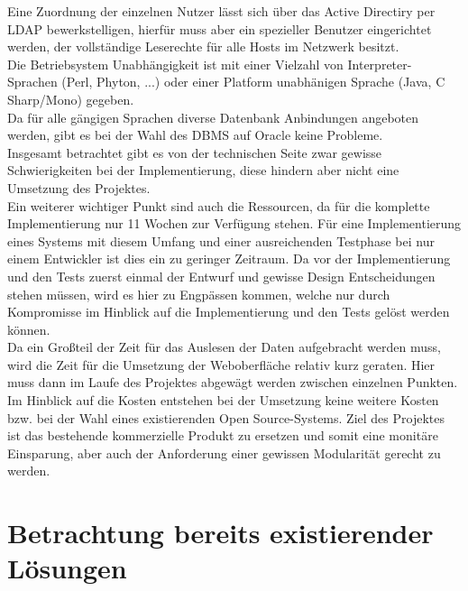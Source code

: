 Eine Zuordnung der einzelnen Nutzer lässt sich über das Active Directiry per LDAP bewerkstelligen, hierfür muss aber ein spezieller Benutzer eingerichtet werden, der vollständige Leserechte für alle Hosts im Netzwerk besitzt.\\
Die Betriebsystem Unabhängigkeit ist mit einer Vielzahl von Interpreter-Sprachen (Perl, Phyton, ...) oder einer Platform unabhänigen Sprache (Java, C Sharp/Mono) gegeben.\\
Da für alle gängigen Sprachen diverse Datenbank Anbindungen angeboten werden, gibt es bei der Wahl des DBMS auf Oracle keine Probleme.\\
Insgesamt betrachtet gibt es von der technischen Seite zwar gewisse Schwierigkeiten bei der Implementierung, diese hindern aber nicht eine Umsetzung des Projektes.\\

Ein weiterer wichtiger Punkt sind auch die Ressourcen, da für die komplette Implementierung nur 11 Wochen zur Verfügung stehen. Für eine Implementierung eines Systems mit diesem Umfang und einer ausreichenden Testphase bei nur einem Entwickler ist dies ein zu geringer Zeitraum. Da vor der Implementierung und den Tests zuerst einmal der Entwurf und gewisse Design Entscheidungen stehen müssen, wird es hier zu Engpässen kommen, welche nur durch Kompromisse im Hinblick auf die Implementierung und den Tests gelöst werden können.\\
Da ein Großteil der Zeit für das Auslesen der Daten aufgebracht werden muss, wird die Zeit für die Umsetzung der Weboberfläche relativ kurz geraten. Hier muss dann im Laufe des Projektes abgewägt werden zwischen einzelnen Punkten.\\

Im Hinblick auf die Kosten entstehen bei der Umsetzung keine weitere Kosten bzw. bei der Wahl eines existierenden Open Source-Systems. Ziel des Projektes ist das bestehende kommerzielle Produkt zu ersetzen und somit eine monitäre Einsparung, aber auch der Anforderung einer gewissen Modularität gerecht zu werden.\\

\section{Betrachtung bereits existierender Lösungen}
\label{sec:exitloesungen}

